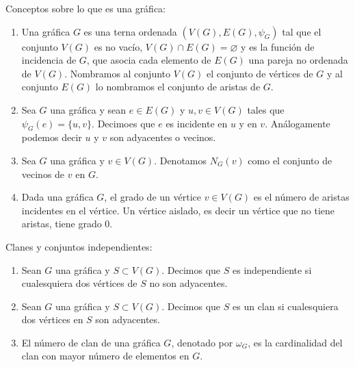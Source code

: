 \begin{definicion} Conceptos sobre lo que es una gr\'afica:
    \label{def:grafica}
    \begin{enumerate}
        \item Una gr\'afica $G$ es una terna ordenada $(V(G), E(G),
        \psi_G)$ tal que el conjunto $V(G)$ es no vac\'i{}o, $V(G) \cap
        E(G) = \varnothing$ y es la funci\'on de incidencia de $G$, que
        asocia cada elemento de $E(G)$ una pareja no ordenada de $V(G)$.
        Nombramos al conjunto $V(G)$ el conjunto de v\'ertices de $G$ y al
        conjunto $E(G)$ lo nombramos el conjunto de aristas de $G$.
        \item Sea $G$ una gr\'afica y sean $e \in E(G)$ y $u,v \in V(G)$
        tales que $\psi_G(e)= \{u, v\}$. Decimoes que $e$ es incidente en
        $u$ y en $v$. An\'alogamente podemos decir $u$ y $v$ son adyacentes
        o vecinos.
        \item Sea $G$ una gr\'afica y $v\in V(G)$. Denotamos $N_G(v)$ como
        el conjunto de vecinos de $v$ en $G$.
        \item Dada una gr\'afica $G$, el grado de un v\'ertice $v \in V(G)$
        es el n\'umero de aristas incidentes en el v\'ertice. Un v\'ertice
        aislado, es decir un v\'ertice que no tiene aristas, tiene grado 0.
    \end{enumerate}
\end{definicion}

\begin{definicion} Clanes y conjuntos independientes:
    \label{def:clanes y conjunto independiente}
    \begin{enumerate}
        \item Sean $G$ una gr\'afica y $S \subset V(G)$. Decimos que $S$ es
        independiente si cualesquiera dos v\'ertices de $S$ no son adyacentes.
        \item Sean $G$ una gr\'afica y $S \subset V(G)$. Decimos que $S$ es un
        clan si cualesquiera dos v\'ertices en $S$ son adyacentes.
        \item El n\'umero de clan de una gr\'afica $G$, denotado por $\omega_G$,
        es la cardinalidad del clan con mayor n\'umero de elementos en $G$.
    \end{enumerate}
\end{definicion}


